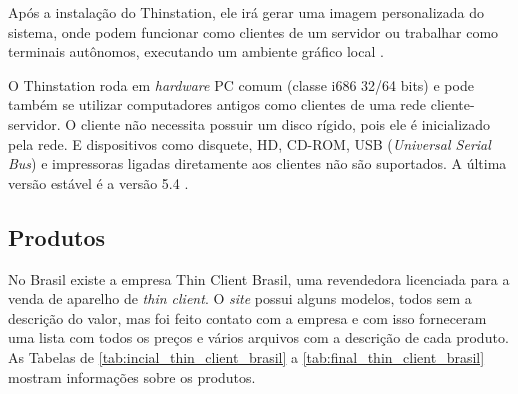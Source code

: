 \documentclass[
	12pt,				%
	openright,			%
	twoside,			%
	a4paper,			%
	chapter=TITLE,		%
	english,			%
	brazil				%
	]{abntex2}
\begin{document}
Após a instalação do Thinstation, ele irá gerar uma imagem personalizada do sistema, onde podem funcionar como clientes de um servidor ou trabalhar como terminais autônomos, executando um ambiente gráfico local \cite{Thinstationl}.

O Thinstation roda em \textit{hardware} PC comum (classe i686 32/64 bits) e pode também se utilizar computadores antigos como clientes de uma rede cliente-servidor. O cliente não necessita possuir um disco rígido, pois ele é inicializado pela rede. E dispositivos como disquete, HD, CD-ROM, USB (\textit{Universal Serial Bus}) e impressoras ligadas diretamente aos clientes não são suportados. A última versão estável é a versão 5.4 \cite{Thinstationl,piaui}.


\subsection{Produtos}

No Brasil existe a empresa Thin Client Brasil, uma revendedora licenciada para a venda de aparelho de \textit{thin client}. O \textit{site} possui alguns modelos, todos sem a descrição do valor, mas foi feito contato com a empresa e com isso forneceram uma lista com todos os preços e vários arquivos com a descrição de cada produto. As Tabelas de \ref{tab:incial_thin_client_brasil} a \ref{tab:final_thin_client_brasil} mostram informações sobre os produtos.

 

 \begin{table}
\end{table}
 
\end{document}
